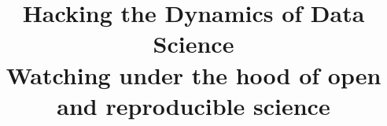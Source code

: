\documentclass{sigchi}
\begin{document}
\title{Hacking the Dynamics of Data Science \\ \vspace{0.3cm} {\LARGE {\bf Watching under the hood of open and reproducible science}}}



\maketitle

\begin{abstract}

\end{abstract}



\end{document}
